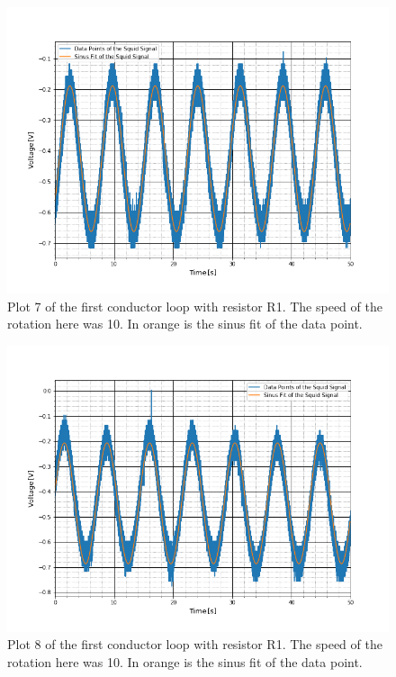 \begin{figure}[ht]
	\includegraphics[scale=0.5]{Bild/r1_10_3}
	\centering
	\caption[Plot of first conductor loop 7]{Plot 7 of the first conductor loop with resistor R1. The speed of the rotation here was 10. In orange is the sinus fit of the data point.}
\end{figure}
\begin{figure}[ht]
	\includegraphics[scale=0.5]{Bild/r1_10_4}
	\centering
	\caption[Plot of first conductor loop 8]{Plot 8 of the first conductor loop with resistor R1. The speed of the rotation here was 10. In orange is the sinus fit of the data point.}
\end{figure}
